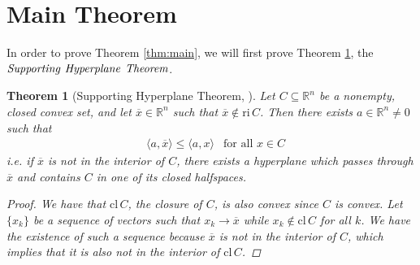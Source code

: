 \documentclass[11pt,reqno]{amsart}
\newcommand{\R}{\mathbb{R}}
\newcommand{\relint}{\mathrm{ri\,}}
\newcommand{\cl}{\mathrm{cl\,}}
\theoremstyle{plain}
\newtheorem{maintheorem}{Theorem}
\theoremstyle{definition}
\begin{document}
\section{Main Theorem}
\label{sec:maintheorem}
{
\setlength{\parskip}{8pt}
In order to prove Theorem \ref{thm:main}, we will first prove Theorem \ref{thm:support}, the $\emph{Supporting}$ $\emph{Hyperplane}$ $\emph{Theorem}$.

\begin{maintheorem}[{Supporting Hyperplane Theorem, \cite[1.5.1]{bertsekas2009convex}}]
    \label{thm:support}
     Let $C\subseteq\R^n$ be a nonempty, closed convex set, and let $\overline{x}\in\R^n$ such that $\overline{x}\notin\relint C$. Then there exists $a\in\R^n\neq 0$ such that
    \begin{align*}
        &\langle a,\overline{x}\rangle \leq\langle a,x\rangle & \text{for all $x\in C$}
    \end{align*}
    \emph{i.e.} if $\overline{x}$ is not in the interior of $C$, there exists a hyperplane which passes through $\overline{x}$ and contains $C$ in one of its closed halfspaces.
    \begin{proof}
        We have that $\cl C$, the closure of $C$, is also convex since $C$ is convex. Let $\{x_k\}$ be a sequence of vectors such that $x_k\rightarrow\overline{x}$ while $x_k\notin\cl C$ for all $k$. We have the existence of such a sequence because $\overline{x}$ is not in the interior of $C$, which implies that it is also not in the interior of $\cl C$.


\end{proof}
\end{maintheorem}}
\end{document}
